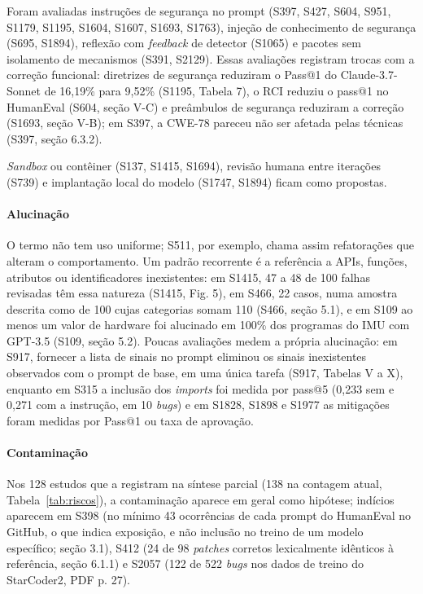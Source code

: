 Foram avaliadas instruções de segurança no prompt (S397, S427, S604, S951, S1179, S1195, S1604, S1607, S1693, S1763), injeção de conhecimento de segurança (S695, S1894), reflexão com \textit{feedback} de detector (S1065) e pacotes sem isolamento de mecanismos (S391, S2129).
Essas avaliações registram trocas com a correção funcional: diretrizes de segurança reduziram o Pass@1 do Claude-3.7-Sonnet de 16,19\% para 9,52\% (S1195, Tabela 7), o RCI reduziu o pass@1 no HumanEval (S604, seção V-C) e preâmbulos de segurança reduziram a correção (S1693, seção V-B); em S397, a CWE-78 pareceu não ser afetada pelas técnicas (S397, seção 6.3.2).

\textit{Sandbox} ou contêiner (S137, S1415, S1694), revisão humana entre iterações (S739) e implantação local do modelo (S1747, S1894) ficam como propostas.

\paragraph{Alucinação}
O termo não tem uso uniforme; S511, por exemplo, chama assim refatorações que alteram o comportamento.
Um padrão recorrente é a referência a APIs, funções, atributos ou identificadores inexistentes: em S1415, 47 a 48 de 100 falhas revisadas têm essa natureza (S1415, Fig. 5), em S466, 22 casos, numa amostra descrita como de 100 cujas categorias somam 110 (S466, seção 5.1), e em S109 ao menos um valor de hardware foi alucinado em 100\% dos programas do IMU com GPT-3.5 (S109, seção 5.2).
Poucas avaliações medem a própria alucinação: em S917, fornecer a lista de sinais no prompt eliminou os sinais inexistentes observados com o prompt de base, em uma única tarefa (S917, Tabelas V a X), enquanto em S315 a inclusão dos \textit{imports} foi medida por pass@5 (0,233 sem e 0,271 com a instrução, em 10 \textit{bugs}) e em S1828, S1898 e S1977 as mitigações foram medidas por Pass@1 ou taxa de aprovação.

\paragraph{Contaminação}
Nos 128 estudos que a registram na síntese parcial (138 na contagem atual, Tabela~\ref{tab:riscos}), a contaminação aparece em geral como hipótese; indícios aparecem em S398 (no mínimo 43 ocorrências de cada prompt do HumanEval no GitHub, o que indica exposição, e não inclusão no treino de um modelo específico; seção 3.1), S412 (24 de 98 \textit{patches} corretos lexicalmente idênticos à referência, seção 6.1.1) e S2057 (122 de 522 \textit{bugs} nos dados de treino do StarCoder2, PDF p. 27).

